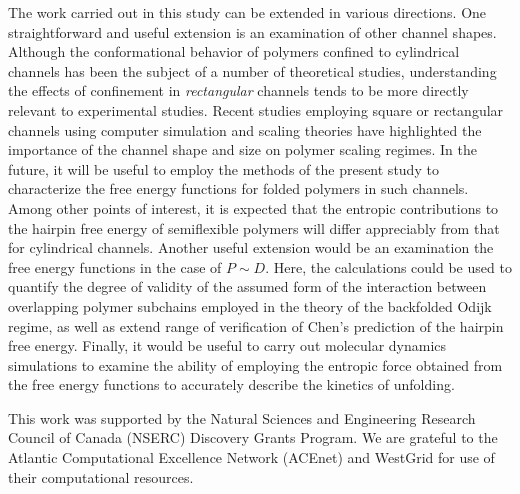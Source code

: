 \documentclass[journal=mamobx,manuscript=article,layout=twocolumn]{achemso}
\begin{document}
The work carried out in this study can be extended in various directions.
One straightforward and useful extension is an examination of other channel shapes.
Although the conformational behavior of polymers confined to cylindrical channels 
has been the subject of a number of theoretical studies, understanding the effects of 
confinement in {\it rectangular} channels tends to be more directly relevant to experimental 
studies.  Recent studies employing square or rectangular channels using computer 
simulation\cite{muralidhar2016backfolding,muralidhar2016backfolded} 
and scaling theories\cite{werner2015scaling} 
have highlighted the importance of the channel shape and size
on polymer scaling regimes. In the future, it will be useful to employ
the methods of the present study to characterize the free energy functions for
folded polymers in such channels. Among other points of interest, it is expected that the 
entropic contributions to the hairpin free energy of semiflexible polymers will 
differ appreciably from that for cylindrical channels. Another useful extension
would be an examination the free energy functions in the case of $P\sim D$.
Here, the calculations could be used to quantify the degree of validity of the 
assumed form of the interaction between overlapping polymer subchains employed in the 
theory of the backfolded Odijk regime, as well as extend range of verification
of Chen's prediction of the hairpin free energy. Finally, it would be useful
to carry out molecular dynamics simulations to examine the ability of employing the 
entropic force obtained from the free energy functions to accurately describe the 
kinetics of unfolding.

\begin{acknowledgement}
This work was supported by the Natural Sciences and Engineering Research Council of Canada (NSERC)
Discovery Grants Program.  We are grateful to the Atlantic Computational 
Excellence Network (ACEnet) and WestGrid for use of their computational resources.
\end{acknowledgement}

% 
\end{document}
